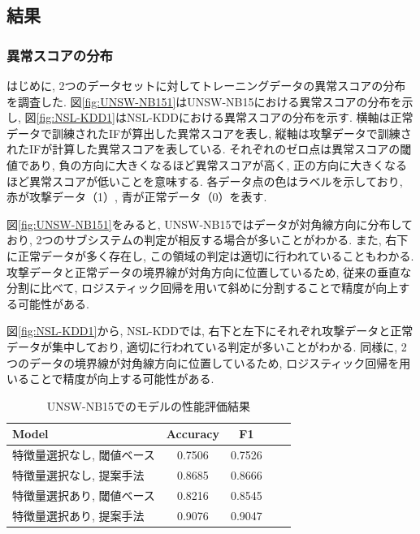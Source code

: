 \documentclass{css}
\begin{document}
\subsection{結果}

\subsubsection{異常スコアの分布}
はじめに, 2つのデータセットに対してトレーニングデータの異常スコアの分布を調査した. 図\ref{fig:UNSW-NB151}はUNSW-NB15における異常スコアの分布を示し, 図\ref{fig:NSL-KDD1}はNSL-KDDにおける異常スコアの分布を示す. 横軸は正常データで訓練されたIFが算出した異常スコアを表し, 縦軸は攻撃データで訓練されたIFが計算した異常スコアを表している. それぞれのゼロ点は異常スコアの閾値であり, 負の方向に大きくなるほど異常スコアが高く, 正の方向に大きくなるほど異常スコアが低いことを意味する. 各データ点の色はラベルを示しており, 赤が攻撃データ（1）, 青が正常データ（0）を表す. 

図\ref{fig:UNSW-NB151}をみると, UNSW-NB15ではデータが対角線方向に分布しており, 2つのサブシステムの判定が相反する場合が多いことがわかる. また, 右下に正常データが多く存在し, この領域の判定は適切に行われていることもわかる. 攻撃データと正常データの境界線が対角方向に位置しているため, 従来の垂直な分割に比べて, ロジスティック回帰を用いて斜めに分割することで精度が向上する可能性がある. 

図\ref{fig:NSL-KDD1}から, NSL-KDDでは, 右下と左下にそれぞれ攻撃データと正常データが集中しており, 適切に行われている判定が多いことがわかる. 同様に, 2つのデータの境界線が対角線方向に位置しているため, ロジスティック回帰を用いることで精度が向上する可能性がある. 

\begin{table}[ht]
    \caption{UNSW-NB15でのモデルの性能評価結果}
    \centering
    \footnotesize
    \begin{tabular}{lcccc}
        \hline\hline
        Model & Accuracy & F1 \\
        \hline
        特徴量選択なし, 閾値ベース & 0.7506 & 0.7526 \\
        特徴量選択なし, 提案手法 & 0.8685 & 0.8666 \\
        特徴量選択あり, 閾値ベース & 0.8216 & 0.8545 \\
        特徴量選択あり, 提案手法 & 0.9076 & 0.9047 \\
        \hline
    \end{tabular}
    \label{tab:model_performance_UNSW-NB15}
\end{table}
\end{document}
